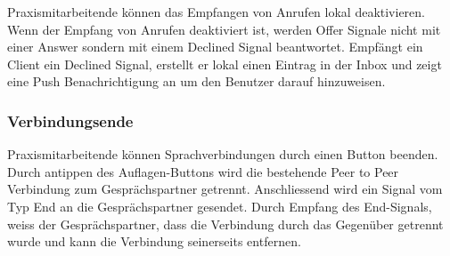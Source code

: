 Praxismitarbeitende können das Empfangen von Anrufen lokal deaktivieren.
Wenn der Empfang von Anrufen deaktiviert ist, werden Offer Signale nicht mit einer Answer sondern mit einem Declined Signal beantwortet.
Empfängt ein Client ein Declined Signal, erstellt er lokal einen Eintrag in der Inbox und zeigt eine Push Benachrichtigung an um den Benutzer darauf hinzuweisen.


\subsubsection{Verbindungsende}

Praxismitarbeitende können Sprachverbindungen durch einen Button beenden.
Durch antippen des Auflagen-Buttons wird die bestehende Peer to Peer Verbindung zum Gesprächspartner getrennt.
Anschliessend wird ein Signal vom Typ End an die Gesprächspartner gesendet.
Durch Empfang des End-Signals, weiss der Gesprächspartner, dass die Verbindung durch das Gegenüber getrennt wurde und kann die Verbindung seinerseits entfernen.

\clearpage
